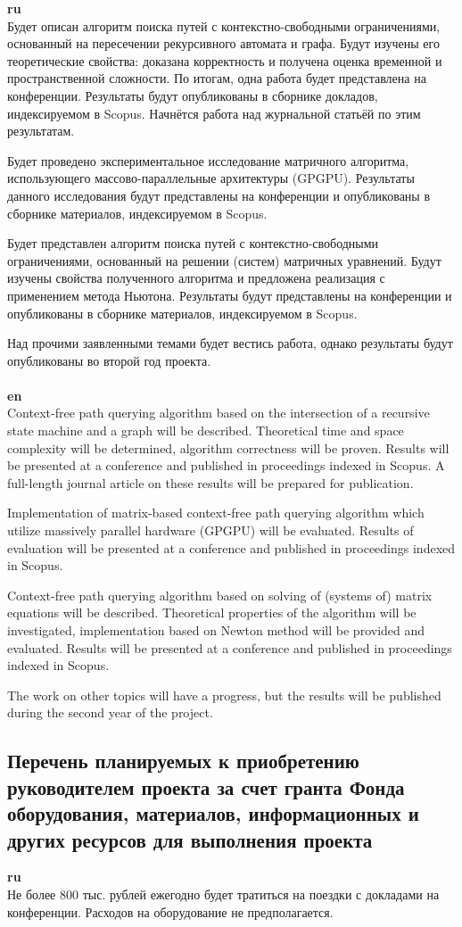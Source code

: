 \documentclass[12pt]{article}  %
\theoremstyle{remark}
\begin{document}
\textbf{ru}\\
%
Будет описан алгоритм поиска путей с контекстно-свободными ограничениями, основанный на пересечении рекурсивного автомата и графа. Будут изучены его теоретические свойства: доказана корректность и получена оценка временной и пространственной сложности. По итогам, одна работа будет представлена на конференции. Результаты будут опубликованы в сборнике докладов, индексируемом в Scopus. Начнётся работа над журнальной статьёй по этим результатам.

Будет проведено экспериментальное исследование матричного алгоритма, использующего массово-параллельные архитектуры (GPGPU). Результаты данного исследования будут представлены на конференции и опубликованы в сборнике материалов, индексируемом в Scopus.

Будет представлен алгоритм поиска путей с контекстно-свободными ограничениями, основанный на решении (систем) матричных уравнений. Будут изучены свойства полученного алгоритма и предложена реализация с применением метода Ньютона. Результаты будут представлены на конференции и опубликованы в сборнике материалов, индексируемом в Scopus.

Над прочими заявленными темами будет вестись работа, однако результаты будут опубликованы во второй год проекта.
\\
\\
\textbf{en}\\
Context-free path querying algorithm based on the intersection of a recursive state machine and a graph will be described. Theoretical time and space complexity will be determined, algorithm correctness will be proven. Results will be presented at a conference and published in proceedings indexed in Scopus. A full-length journal article on these results will be prepared for publication.

Implementation of matrix-based context-free path querying algorithm which utilize massively parallel hardware (GPGPU) will be evaluated. Results of evaluation will be presented at a conference and published in proceedings indexed in Scopus.

Context-free path querying algorithm based on solving of (systems of) matrix equations will be described. Theoretical properties of the algorithm will be investigated, implementation based on Newton method will be provided and evaluated. Results will be presented at a conference and published in proceedings indexed in Scopus.

The work on other topics will have a progress, but the results will be published during the second year of the project.

\subsection{Перечень планируемых к приобретению руководителем проекта за счет гранта Фонда оборудования, материалов, информационных и других ресурсов для выполнения проекта}

\textbf{ru}\\
%
Не более 800 тыс. рублей ежегодно будет тратиться на поездки с докладами на конференции. Расходов на оборудование не предполагается.
\end{document}
